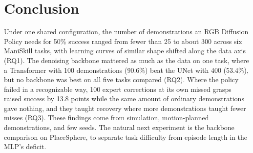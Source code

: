 \section{Conclusion}
\label{sec:conclusion}
Under one shared configuration, the number of demonstrations an RGB Diffusion
Policy needs for 50\% success ranged from fewer than 25 to about 300 across
six ManiSkill tasks, with learning curves of similar shape shifted along the
data axis (RQ1). The denoising backbone mattered as much as the data on one
task, where a Transformer with 100 demonstrations (90.6\%) beat the UNet with
400 (53.4\%), but no backbone was best on all five tasks compared (RQ2). Where
the policy failed in a recognizable way, 100 expert corrections at its own
missed grasps raised success by 13.8 points while the same amount of ordinary
demonstrations gave nothing, and they taught recovery where more
demonstrations taught fewer misses (RQ3). These findings come from simulation,
motion-planned demonstrations, and few seeds. The natural next experiment is
the backbone comparison on PlaceSphere, to separate task difficulty from
episode length in the MLP's deficit.
